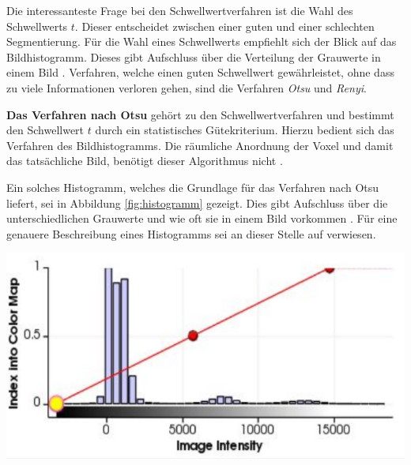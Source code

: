 Die interessanteste Frage bei den Schwellwertverfahren ist die Wahl des Schwellwerts
$t$. Dieser entscheidet zwischen einer guten und einer schlechten Segmentierung.
Für die Wahl eines Schwellwerts empfiehlt sich der Blick auf das Bildhistogramm.
Dieses gibt Aufschluss über die Verteilung der Grauwerte in einem Bild \citep[vgl.][S.~361]{lehmann2013bildverarbeitung}.
Verfahren, welche einen guten Schwellwert gewährleistet, ohne dass zu viele
Informationen verloren gehen, sind die Verfahren \textit{Otsu} und \textit{Renyi}.

\pagebreak

\textbf{Das Verfahren nach Otsu} gehört zu den Schwellwertverfahren und bestimmt
den Schwellwert $t$ durch ein statistisches Gütekriterium. Hierzu bedient sich
das Verfahren des Bildhistogramms. Die räumliche Anordnung der Voxel und damit das
tatsächliche Bild, benötigt dieser Algorithmus nicht \citep[vgl.][S.~264]{lehmann2013bildverarbeitung}.

\begin{minipage}{0.40\textwidth}
	Ein solches Histogramm, welches die Grundlage für das Verfahren nach Otsu
	liefert, sei in Abbildung \ref{fig:histogramm} gezeigt. Dies gibt Aufschluss
	über die unterschiedlichen Grauwerte und wie oft sie in einem Bild vorkommen
	\citep[vgl.][S.~264]{lehmann2013bildverarbeitung}. Für eine genauere
	Beschreibung eines Histogramms sei an dieser Stelle auf \citet[S.~42]{burger2009}
	verwiesen.
\end{minipage}
\hfill
\begin{minipage}{0.50\textwidth}
	\centering
	\includegraphics[width=1\textwidth]{img/histogramm.jpg}
	\label{fig:histogramm}
\end{minipage}

